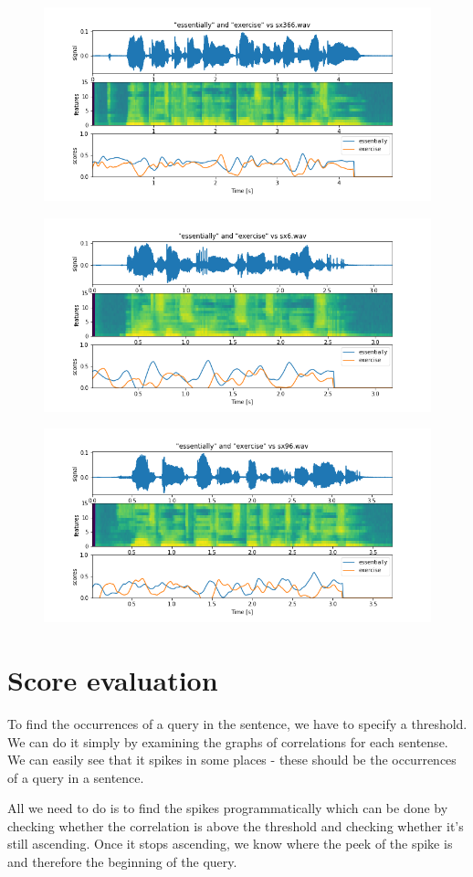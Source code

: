 \documentclass[11pt]{article}
\begin{document}
\begin{figure}[H]
	\includegraphics[width=\linewidth]{./docs/sx366.png}
\end{figure}
\begin{figure}[H]
	\includegraphics[width=\linewidth]{./docs/sx6.png}
\end{figure}
\begin{figure}[H]
	\includegraphics[width=\linewidth]{./docs/sx96.png}
\end{figure}

\section{Score evaluation}
\par
To find the occurrences of a query in the sentence, we have to specify a threshold. We can do it simply by examining the graphs of correlations for each sentense. We can easily see that it spikes in some places - these should be the occurrences of a query in a sentence.
\par
All we need to do is to find the spikes programmatically which can be done by checking whether the correlation is above the threshold and checking whether it's still ascending. Once it stops ascending, we know where the peek of the spike is and therefore the beginning of the query.
\end{document}
